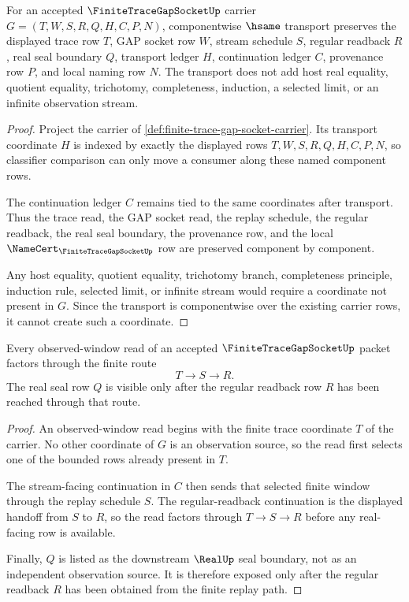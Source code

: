 \begin{theorem}
\label{thm:finite-trace-gap-socket-classifier-transport}
For an accepted $\FiniteTraceGapSocketUp$ carrier $G=(T,W,S,R,Q,H,C,P,N)$, componentwise $\hsame$ transport preserves the displayed trace row $T$, GAP socket row $W$, stream schedule $S$, regular readback $R$, real seal boundary $Q$, transport ledger $H$, continuation ledger $C$, provenance row $P$, and local naming row $N$. The transport does not add host real equality, quotient equality, trichotomy, completeness, induction, a selected limit, or an infinite observation stream.
\end{theorem}
\begin{proof}
Project the carrier of \autoref{def:finite-trace-gap-socket-carrier}. Its transport coordinate $H$ is indexed by exactly the displayed rows $T,W,S,R,Q,H,C,P,N$, so classifier comparison can only move a consumer along these named component rows.

The continuation ledger $C$ remains tied to the same coordinates after transport. Thus the trace read, the GAP socket read, the replay schedule, the regular readback, the real seal boundary, the provenance row, and the local $\NameCert_{\FiniteTraceGapSocketUp}$ row are preserved component by component.

Any host equality, quotient equality, trichotomy branch, completeness principle, induction rule, selected limit, or infinite stream would require a coordinate not present in $G$. Since the transport is componentwise over the existing carrier rows, it cannot create such a coordinate.
\end{proof}

\begin{theorem}
\label{thm:finite-trace-gap-socket-replay-exactness}
Every observed-window read of an accepted $\FiniteTraceGapSocketUp$ packet factors through the finite route
$$
T \to S \to R.
$$
The real seal row $Q$ is visible only after the regular readback row $R$ has been reached through that route.
\end{theorem}
\begin{proof}
An observed-window read begins with the finite trace coordinate $T$ of the carrier. No other coordinate of $G$ is an observation source, so the read first selects one of the bounded rows already present in $T$.

The stream-facing continuation in $C$ then sends that selected finite window through the replay schedule $S$. The regular-readback continuation is the displayed handoff from $S$ to $R$, so the read factors through $T \to S \to R$ before any real-facing row is available.

Finally, $Q$ is listed as the downstream $\RealUp$ seal boundary, not as an independent observation source. It is therefore exposed only after the regular readback $R$ has been obtained from the finite replay path.
\end{proof}

